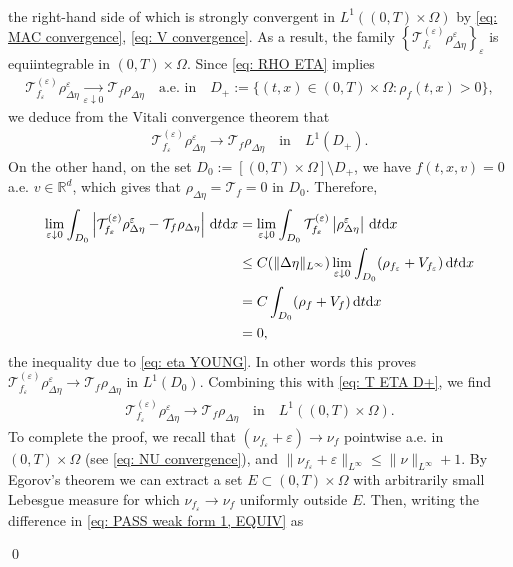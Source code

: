 \documentclass[10pt, reqno]{amsart}
\theoremstyle{plain}
\theoremstyle{definition}
\theoremstyle{remark}
\renewenvironment{proof}[1][\proofname]{\noindent{\scshape #1.\quad}}{\qed}
\numberwithin{equation}{section}
\newcommand{\calT}{\mathcal T}
\newcommand{\R}{\mathbb{R}}
\newcommand{\ve}{\varepsilon}
\newcommand{\dx}{\textnormal{d}x}
\newcommand{\dt}{\textnormal{d}t}
\newcommand{\lt}{\left}
\newcommand{\rt}{\right}
\begin{document}
\begin{proof}
\begin{align}
\end{align}
the right-hand side of which is strongly convergent in $L^1((0,T)\times\Omega)$ by \eqref{eq: MAC convergence}, \eqref{eq: V convergence}. As a result, the family $\lt\{\calT_{f_\ve}^{(\ve)} \rho_{\Delta\eta}^\ve \rt\}_\ve$ is equiintegrable in $(0,T)\times\Omega$. Since \eqref{eq: RHO ETA} implies
\begin{align*}
    \calT_{f_\ve}^{(\ve)} \rho_{\Delta\eta}^\ve \xrightarrow[\ve\downarrow 0]{} \calT_f \rho_{\Delta\eta} \quad \text{a.e. in}\quad D_+ := \{(t,x)\in (0,T)\times\Omega: \rho_f(t,x)>0\},
\end{align*}
we deduce from the Vitali convergence theorem that
\begin{align}\label{eq: T ETA D+}
    \calT_{f_\ve}^{(\ve)} \rho_{\Delta\eta}^\ve \to \calT_{f} \rho_{\Delta\eta} \quad \text{in} \quad L^1(D_+).
\end{align}
On the other hand, on the set $D_0 := [(0,T)\times \Omega]\setminus D_+$, we have $f(t,x,v) = 0$ a.e. $v\in \R^d$, which gives that $\rho_{\Delta\eta} = \calT_f = 0$ in $D_0$. Therefore, 
\begin{equation} \label{eq: T ETA D0}
\begin{split}
    \lim_{\ve\downarrow 0} \int_{D_0} \lt| \calT_{f_\ve}^{(\ve)} \rho_{\Delta\eta}^\ve - \calT_f \rho_{\Delta\eta} \rt| \,\dt\dx &= \lim_{\ve\downarrow 0}\int_{D_0} \calT_{f_\ve}^{(\ve)} \lt|\rho_{\Delta\eta}^\ve \rt| \,\dt\dx \\
    &\le C(\|\Delta\eta\|_{L^\infty}) \lim_{\ve\downarrow 0} \int_{D_0} (\rho_{f_\ve} + V_{f_\ve}) \,\dt\dx\\
    &= C \int_{D_0} (\rho_f + V_f) \,\dt\dx\\
    &= 0,
\end{split}
\end{equation}
the inequality due to \eqref{eq: eta YOUNG}. In other words this proves $\calT_{f_\ve}^{(\ve)} \rho_{\Delta\eta}^\ve \to \calT_f \rho_{\Delta\eta}$ in $L^1(D_0)$. Combining this with \eqref{eq: T ETA D+}, we find
\begin{align}\label{eq: PASS prod T eta}
    \calT_{f_\ve}^{(\ve)} \rho_{\Delta\eta}^\ve \to \calT_f \rho_{\Delta\eta} \quad \text{in} \quad L^1((0,T)\times\Omega).
\end{align}
To complete the proof, we recall that $(\nu_{f_\ve} + \ve) \to \nu_f$ pointwise a.e. in $(0,T)\times \Omega$ (see \eqref{eq: NU convergence}), and $\|\nu_{f_\ve} + \ve\|_{L^\infty} \le \|\nu\|_{L^\infty} + 1$. By Egorov's theorem we can extract a set $E\subset (0,T)\times\Omega$ with arbitrarily small Lebesgue measure for which $\nu_{f_\ve} \to \nu_f$ uniformly outside $E$. Then, writing the difference in \eqref{eq: PASS weak form 1, EQUIV} as

\end{proof}
\end{document}
